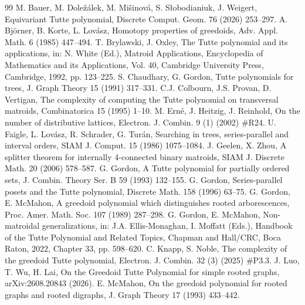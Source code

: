 \documentclass[10pt,a4paper]{amsart}
\begin{document}
\begin{thebibliography}{99}
 M. Bauer, M. Dole\v{z}\'alek, M. Mi\v{s}inov\'a, S. S{\l}obodianiuk, J. Weigert, Equivariant Tutte polynomial, Discrete Comput. Geom. 76 (2026) 253--297.
 A. Bj\"orner, B. Korte, L. Lov\'asz, Homotopy properties of greedoids, Adv. Appl. Math. 6 (1985) 447--494.
 T. Brylawski, J. Oxley, The Tutte polynomial and its applications, in: N. White (Ed.), Matroid Applications, Encyclopedia of Mathematics and its Applications, Vol. 40, Cambridge University Press, Cambridge, 1992, pp. 123--225.
 S. Chaudhary, G. Gordon, Tutte polynomials for trees, J. Graph Theory 15 (1991) 317--331.
 C.J. Colbourn, J.S. Provan, D. Vertigan, The complexity of computing the Tutte polynomial on transversal matroids, Combinatorica 15 (1995) 1--10.
 M. Ern\'e, J. Heitzig, J. Reinhold, On the number of distributive lattices, Electron. J. Combin. 9 (1) (2002) \#R24.
 U. Faigle, L. Lov\'asz, R. Schrader, G. Tur\'an, Searching in trees, series-parallel and interval orders, SIAM J. Comput. 15 (1986) 1075--1084.
 J. Geelen, X. Zhou, A splitter theorem for internally 4-connected binary matroids, SIAM J. Discrete Math. 20 (2006) 578--587.
 G. Gordon, A Tutte polynomial for partially ordered sets, J. Combin. Theory Ser. B 59 (1993) 132--155.
 G. Gordon, Series-parallel posets and the Tutte polynomial, Discrete Math. 158 (1996) 63--75.
 G. Gordon, E. McMahon, A greedoid polynomial which distinguishes rooted arborescences, Proc. Amer. Math. Soc. 107 (1989) 287--298.
 G. Gordon, E. McMahon, Non-matroidal generalizations, in: J.A. Ellis-Monaghan, I. Moffatt (Eds.), Handbook of the Tutte Polynomial and Related Topics, Chapman and Hall/CRC, Boca Raton, 2022, Chapter 33, pp. 598--620.
 C. Knapp, S. Noble, The complexity of the greedoid Tutte polynomial, Electron. J. Combin. 32 (3) (2025) \#P3.3.
 J. Luo, T. Wu, H. Lai, On the Greedoid Tutte Polynomial for simple rooted graphs, arXiv:2608.20843 (2026).
 E. McMahon, On the greedoid polynomial for rooted graphs and rooted digraphs, J. Graph Theory 17 (1993) 433--442.

\end{thebibliography}
\end{document}
